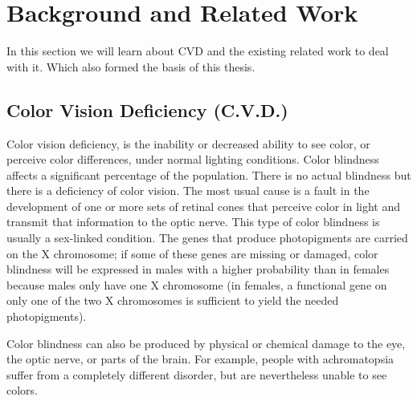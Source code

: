 \chapter{Background and Related Work}
\thispagestyle{plain}

\label{Background and Related Work}

In this section we will learn about CVD and the existing related work to deal with it. Which also formed the basis of this thesis.

\section{Color Vision Deficiency (C.V.D.)}
\label{Color Vision Deficiency}


Color vision deficiency, is the inability or decreased ability to see color, or perceive color differences, under normal lighting conditions. Color blindness affects a significant percentage of the population.  There is no actual blindness but there is a deficiency of color vision. The most usual cause is a fault in the development of one or more sets of retinal cones that perceive color in light and transmit that information to the optic nerve. This type of color blindness is usually a sex-linked condition. The genes that produce photopigments are carried on the X chromosome; if some of these genes are missing or damaged, color blindness will be expressed in males with a higher probability than in females because males only have one X chromosome (in females, a functional gene on only one of the two X chromosomes is sufficient to yield the needed photopigments).

Color blindness can also be produced by physical or chemical damage to the eye, the optic nerve, or parts of the brain. For example, people with achromatopsia suffer from a completely different disorder, but are nevertheless unable to see colors.

